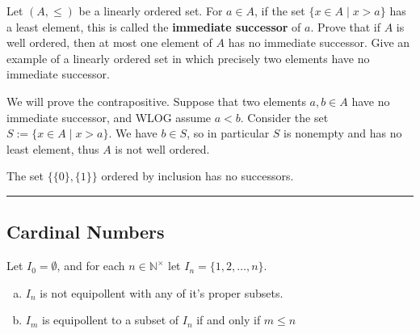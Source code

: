 \begin{exercise}
    Let $(A,\le)$ be a linearly ordered set. For $a\in A$, if the set $\{x\in A\mid x > a\}$ has a least element, this is called the \textbf{immediate successor} of $a$. Prove that if $A$ is well ordered, then at most one element of $A$ has no immediate successor. Give an example of a linearly ordered set in which precisely two elements have no immediate successor.
\end{exercise}
\begin{solution}
    We will prove the contrapositive. Suppose that two elements $a,b\in A$ have no immediate successor, and WLOG assume $a < b$. Consider the set $S := \{x\in A\mid x > a\}$. We have $b\in S$, so in particular $S$ is nonempty and has no least element, thus $A$ is not well ordered.

    The set $\{\{0\},\{1\}\}$ ordered by inclusion has no successors.
\end{solution}
\hrule

\pagebreak
\subsection{Cardinal Numbers}

\begin{exercise}
    Let $I_0 = \emptyset$, and for each $n\in\mathbb{N}^\times$ let $I_n = \{1,2,\dots,n\}$.
    \begin{enumerate}[(a)]
        \item $I_n$ is not equipollent with any of it's proper subsets.
        \item $I_m$ is equipollent to a subset of $I_n$ if and only if $m \le n$
    \end{enumerate}
\end{exercise}


